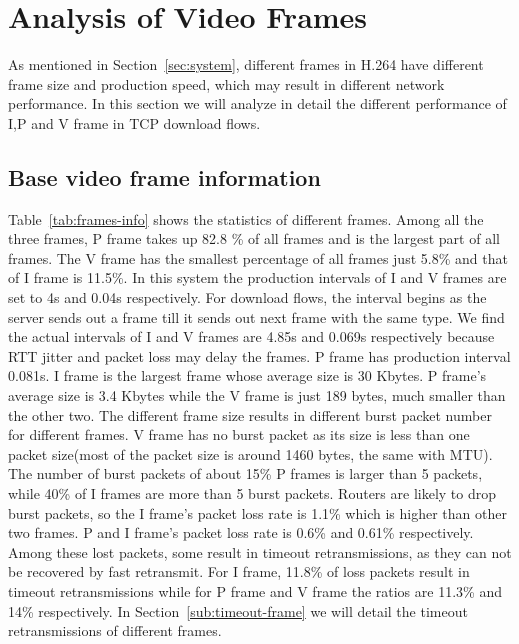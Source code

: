 
\section{Analysis of Video Frames}
\label{sec:frame-analysis}

As mentioned in Section~\ref{sec:system}, different frames in H.264 have different frame size and production speed, which may result in different network performance. In this section we will analyze in detail the different performance of I,P and V frame in TCP download flows. 

\subsection{Base video frame information}
\label{sub:base-frame}

Table~\ref{tab:frames-info} shows the statistics of different frames. Among all the three frames, P frame takes up 82.8 \% of all frames and is the largest part of all frames. The V frame has the smallest percentage of all frames just 5.8\% and that of I frame is 11.5\%. In this system the production intervals of I and V frames are set to 4s and 0.04s respectively. For download flows, the interval begins as the server sends out a frame till it sends out next frame with the same type. We find the actual intervals of I and V frames are 4.85s and 0.069s respectively because RTT jitter and packet loss may delay the frames. P frame has production interval 0.081s. I frame is the largest frame whose average size is 30 Kbytes. P frame's average size is 3.4 Kbytes while the V frame is just 189 bytes, much smaller than the other two. The different frame size results in different burst packet number for different frames. V frame has no burst packet as its size is less than one packet size(most of the packet size is around 1460 bytes, the same with MTU). The number of burst packets of about 15\% P frames is larger than 5 packets, while 40\% of I frames are more than 5 burst packets. Routers are likely to drop burst packets, so the I frame's packet loss rate is 1.1\% which is higher than other two frames. P and I frame's packet loss rate is 0.6\% and 0.61\% respectively. Among these lost packets, some result in timeout retransmissions, as they can not be recovered by fast retransmit. For I frame, 11.8\% of loss packets result in timeout retransmissions while for P frame and V frame the ratios are 11.3\% and 14\% respectively. In Section~\ref{sub:timeout-frame} we will detail the timeout retransmissions of different frames.

